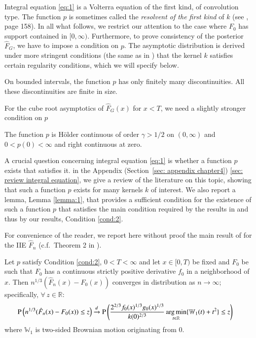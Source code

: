 Integral equation \eqref{eq:1} is a Volterra equation of the first kind, of convolution type. The function $p$ is sometimes called the \textit{resolvent of the first kind} of $k$ (see \cite{103}, page 158). In all what follows, we restrict our attention to the case where $F_0$ has support contained in $[0, \infty)$. Furthermore, to prove consistency of the posterior $\hat{F}_{\scriptscriptstyle{G}}$, we have to impose a condition on $p$. The asymptotic distribution is derived under more stringent conditions (the same as in \cite{74}) that the kernel $k$ satisfies certain regularity conditions, which we will specify below.

\begin{condition} \label{cond:1}
On bounded intervals, the function $p$ has only finitely many discontinuities. All these discontinuities are finite in size.
\end{condition}

For the cube root asymptotics of $\hat{F}_{\scriptscriptstyle{G}}(x)$ for $x < T$, we need a slightly stronger condition on $p$

\begin{condition} \label{cond:2}
The function $p$ is H\"{o}lder continuous of order $\gamma > 1/2$ on $(0, \infty)$ and $0 < p(0) < \infty$ and right continuous at zero.
\end{condition}

A crucial question concerning integral equation \eqref{eq:1} is whether a function $p$ exists that satisfies it. in the Appendix (Section~\ref{sec: appendix chapter4}) \ref{sec: review integral equation}, we give a review of the literature on this topic, showing that such a function $p$ exists for many kernels $k$ of interest. We also report a lemma, Lemma \ref{lemma:1}, that provides a sufficient condition for the existence of such a function $p$ that satisfies the main condition required by the results in \cite{74} and thus by our results, Condition \ref{cond:2}.

For convenience of the reader, we report here without proof the main result of \cite{74} for the IIE $\hat{F}_n$ (c.f.\ Theorem 2 in \cite{74}).

\begin{theorem}\label{thm: frequentist UQ}
Let $p$ satisfy Condition \ref{cond:2}, $0 < T < \infty$ and let $x \in [0, T)$ be fixed and $F_0$ be such that $F_0$ has a continuous strictly positive derivative $f_0$ in a neighborhood of $x$. Then $n^{1/3}(\hat{F}_n(x) - F_0(x))$ converges in distribution as $n \to \infty$; specifically, $\forall \, z \in \mathbb{R}$:
\begin{align}
&\mathrm{P} \left( n^{1/3} (\hat{F}_n(x) - F_0(x)) \le z \right) \xrightarrow{d} \mathrm{P} \left( \frac{2^{2/3} f_0(x)^{1/3} g_0(x)^{1/3}}{k(0)^{2/3}} \operatorname*{arg\,min}_{t \in \mathbb{R}} \{\mathbb{W}_1(t) + t^2 \} \le z \right)
\end{align}
where $\mathbb{W}_1$ is two-sided Brownian motion originating from $0$.
\end{theorem}


